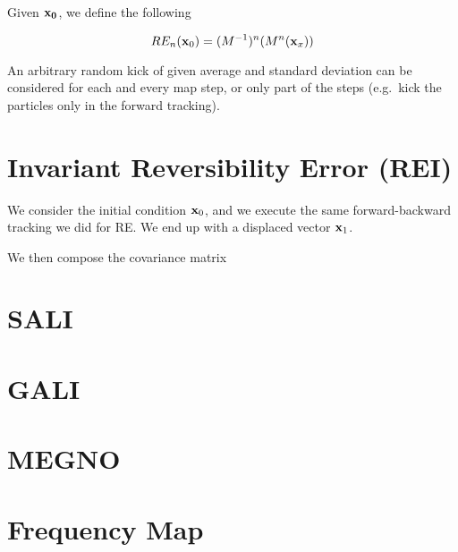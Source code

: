\documentclass[10pt,a4paper]{article}
\begin{document}
Given $\vb{x_0}$, we define the following

\begin{equation}
    RE_n(\vb{x}_0) = (M^{-1})^n(M^{n}(\vb{x}_x))
\end{equation}

An arbitrary random kick of given average and standard deviation can be considered for each and every map step, or only part of the steps (e.g.\ kick the particles only in the forward tracking).

\section{Invariant Reversibility Error (REI)}

We consider the initial condition $\vb{x}_0$, and we execute the same forward-backward tracking we did for RE. We end up with a displaced vector $\vb{x}_1$.

We then compose the covariance matrix
\begin{equation}
    
\end{equation} 

\section{SALI}

\section{GALI}

\section{MEGNO}

\section{Frequency Map}
\end{document}
